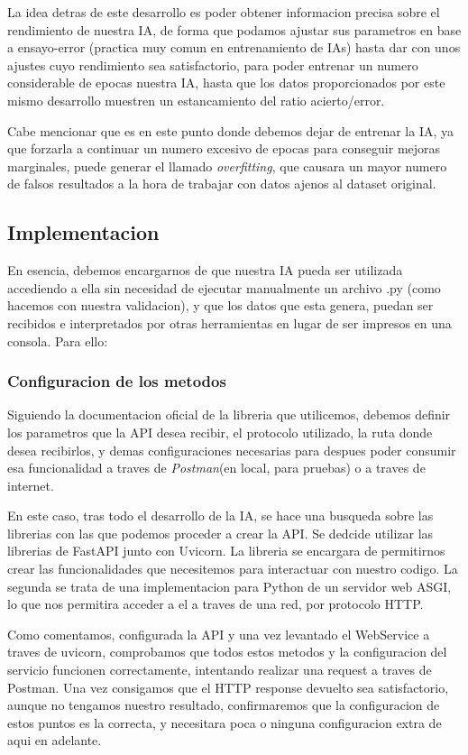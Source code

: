 \documentclass{article}
\begin{document}
La idea detras de este desarrollo es poder obtener informacion precisa sobre el rendimiento de nuestra IA, de forma que podamos ajustar sus parametros en base a ensayo-error (practica muy comun en entrenamiento de IAs) hasta dar con unos ajustes cuyo rendimiento sea satisfactorio, para poder entrenar un numero considerable de epocas nuestra IA, hasta que los datos proporcionados por este mismo desarrollo muestren un estancamiento del ratio acierto/error. 

Cabe mencionar que es en este punto donde debemos dejar de entrenar la IA, ya que forzarla a continuar un numero excesivo de epocas para conseguir mejoras marginales, puede generar el llamado \textit{overfitting}\rep, que causara un mayor numero de falsos resultados a la hora de trabajar con datos ajenos al dataset original.

\subsection{Implementacion}

En esencia, debemos encargarnos de que nuestra IA pueda ser utilizada accediendo a ella sin necesidad de ejecutar manualmente un archivo .py (como hacemos con nuestra validacion), y que los datos que esta genera, puedan ser recibidos e interpretados por otras herramientas en lugar de ser impresos en una consola. Para ello:

\subsubsection{Configuracion de los metodos}
Siguiendo la documentacion oficial de la libreria que utilicemos, debemos definir los parametros que la API desea recibir, el protocolo utilizado, la ruta donde desea recibirlos, y demas configuraciones necesarias para despues poder consumir esa funcionalidad a traves de \textit{Postman}\rep (en local, para pruebas) o a traves de internet.

En este caso, tras todo el desarrollo de la IA, se hace una busqueda sobre las librerias con las que podemos proceder a crear la API. Se dedcide utilizar las librerias de FastAPI junto con Uvicorn. La libreria se encargara de permitirnos crear las funcionalidades que necesitemos para interactuar con nuestro codigo. La segunda se trata de una implementacion para Python de un servidor web ASGI, lo que nos permitira acceder a el a traves de una red, por protocolo HTTP.

Como comentamos, configurada la API y una vez levantado el WebService a traves de uvicorn, comprobamos que todos estos metodos y la configuracion del servicio funcionen correctamente, intentando realizar una request a traves de Postman. Una vez consigamos que el HTTP response devuelto sea satisfactorio, aunque no tengamos nuestro resultado, confirmaremos que la configuracion de estos puntos es la correcta, y necesitara poca o ninguna configuracion extra de aqui en adelante.
\end{document}

